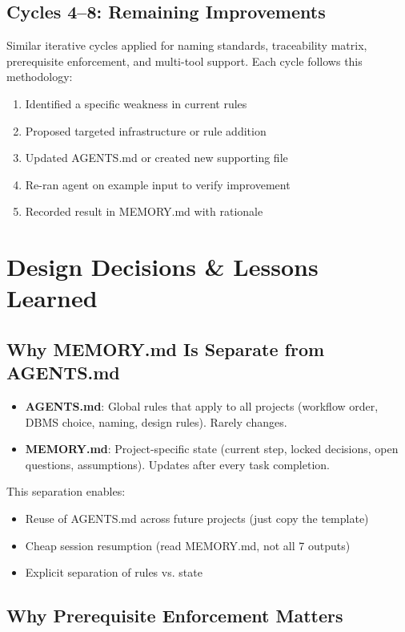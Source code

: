 \documentclass[12pt,a4paper]{article}
\begin{document}
\subsection{Cycles 4--8: Remaining Improvements}
Similar iterative cycles applied for naming standards, traceability matrix, prerequisite enforcement, and multi-tool support. Each cycle follows this methodology:
\begin{enumerate}
    \item Identified a specific weakness in current rules
    \item Proposed targeted infrastructure or rule addition
    \item Updated AGENTS.md or created new supporting file
    \item Re-ran agent on example input to verify improvement
    \item Recorded result in MEMORY.md with rationale
\end{enumerate}

\section{Design Decisions \& Lessons Learned}

\subsection{Why MEMORY.md Is Separate from AGENTS.md}

\begin{itemize}
    \item \textbf{AGENTS.md}: Global rules that apply to all projects (workflow order, DBMS choice, naming, design rules). Rarely changes.
    \item \textbf{MEMORY.md}: Project-specific state (current step, locked decisions, open questions, assumptions). Updates after every task completion.
\end{itemize}

This separation enables:
\begin{itemize}
    \item Reuse of AGENTS.md across future projects (just copy the template)
    \item Cheap session resumption (read MEMORY.md, not all 7 outputs)
    \item Explicit separation of rules vs. state
\end{itemize}

\subsection{Why Prerequisite Enforcement Matters}
\end{document}
